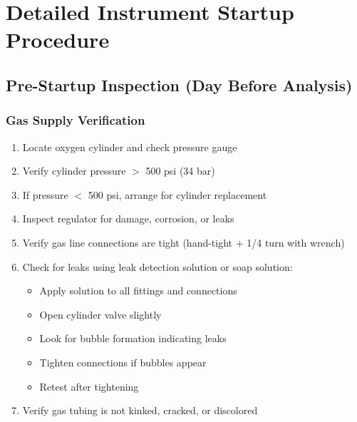 \documentclass[11pt,a4paper]{article}\usepackage[]{graphicx}\usepackage[]{xcolor}
\begin{document}
\section{Detailed Instrument Startup Procedure}

\subsection{Pre-Startup Inspection (Day Before Analysis)}

\subsubsection{Gas Supply Verification}
\begin{enumerate}[noitemsep]
    \item Locate oxygen cylinder and check pressure gauge
    \item Verify cylinder pressure $>$ 500 psi (34 bar)
    \item If pressure $<$ 500 psi, arrange for cylinder replacement
    \item Inspect regulator for damage, corrosion, or leaks
    \item Verify gas line connections are tight (hand-tight + 1/4 turn with wrench)
    \item Check for leaks using leak detection solution or soap solution:
    \begin{itemize}
        \item Apply solution to all fittings and connections
        \item Open cylinder valve slightly
        \item Look for bubble formation indicating leaks
        \item Tighten connections if bubbles appear
        \item Retest after tightening
    \end{itemize}
    \item Verify gas tubing is not kinked, cracked, or discolored
\end{enumerate}
\end{document}
